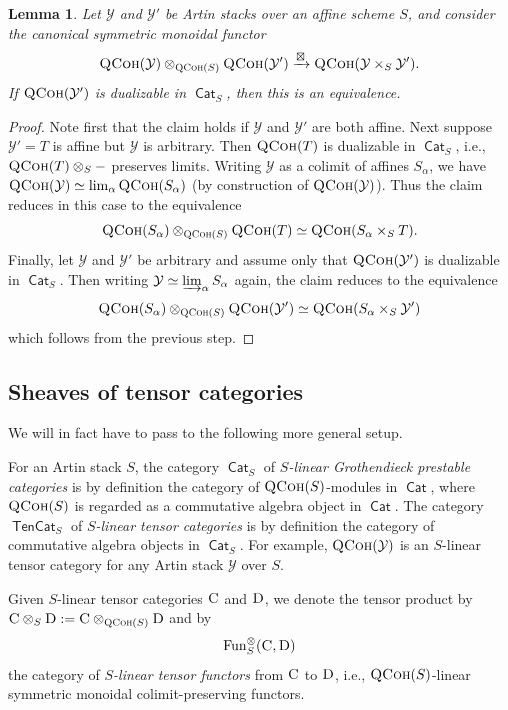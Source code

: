 \documentclass[12pt, oneside]{amsart}
\numberwithin{equation}{section}
\newtheorem{lemma}[subsubsection]{Lemma}
\theoremstyle{remark}
\theoremstyle{plain}
\newcommand{\Cat}{\operatorname{\mathsf{Cat}}}
\newcommand{\TenCat}{\operatorname{\mathsf{TenCat}}}
\newcommand{\CCC}{\TenCat}
\newcommand{\CC}{\textsc{C}}
\newcommand{\DD}{\textsc{D}}
\DeclareMathOperator{\QCoh}{\textsc{QCoh}}
\newcommand{\TensFun}{\operatorname{Fun}^{\otimes}}
\newcommand{\YY}{\mathcal{Y}}
\begin{document}
\begin{lemma}\label{lem:easyKunnethforQCoh}
  Let $\YY$ and $\YY'$ be Artin stacks over an affine scheme $S$, and consider the canonical symmetric monoidal functor
  \[ \QCoh(\YY) \otimes_{\QCoh(S)} \QCoh(\YY') \xrightarrow{\boxtimes} \QCoh(\YY \times_S \YY'). \]
  If $\QCoh(\YY')$ is dualizable in $\Cat_S$, then this is an equivalence.
\end{lemma}
\begin{proof}
  Note first that the claim holds if $\YY$ and $\YY'$ are both affine.
  Next suppose $\YY'=T$ is affine but $\YY$ is arbitrary.
  Then $\QCoh(T)$ is dualizable in $\Cat_S$, i.e., $\QCoh(T)\otimes_S -$ preserves limits.
  Writing $\YY$ as a colimit of affines $S_\alpha$, we have $\QCoh(\YY) \simeq \lim_\alpha \QCoh(S_\alpha)$ (by construction of $\QCoh(\YY)$).
  Thus the claim reduces in this case to the equivalence $$\QCoh(S_\alpha) \otimes_{\QCoh(S)} \QCoh(T) \simeq \QCoh(S_\alpha \times_S T).$$
  Finally, let $\YY$ and $\YY'$ be arbitrary and assume only that $\QCoh(\YY')$ is dualizable in $\Cat_S$.
  Then writing $\YY \simeq \varinjlim_\alpha S_\alpha$ again, the claim reduces to the equivalence $$\QCoh(S_\alpha) \otimes_{\QCoh(S)} \QCoh(\YY') \simeq \QCoh(S_\alpha \times_S \YY')$$ which follows from the previous step.
\end{proof}

\subsection{Sheaves of tensor categories}\label{ssec:sheaves tensorcat}

We will in fact have to pass to the following more general setup.

For an Artin stack $S$, the category $\Cat_S$ of \emph{$S$-linear Grothendieck prestable categories} is by definition the category of $\QCoh(S)$-modules in $\Cat$, where $\QCoh(S)$ is regarded as a commutative algebra object in $\Cat$. The category $\CCC_S$ of \emph{$S$-linear tensor categories} is by definition the category of commutative algebra objects in $\Cat_S$. For example, $\QCoh(\YY)$ is an $S$-linear tensor category for any Artin stack $\YY$ over $S$.

Given $S$-linear tensor categories $\CC$ and $\DD$, we denote the tensor product by $\CC \otimes_S \DD := \CC \otimes_{\QCoh(S)} \DD$ and by $$\TensFun_S(\CC, \DD)$$ the category of \emph{$S$-linear tensor functors} from $\CC$ to $\DD$, i.e., $\QCoh(S)$-linear symmetric monoidal colimit-preserving functors.
\end{document}

